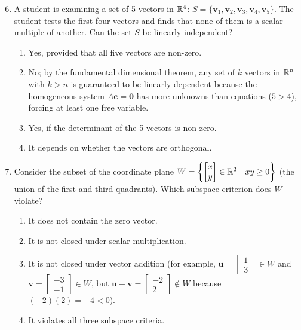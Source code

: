 \begin{enumerate}
    \setcounter{enumi}{5}
    \item A student is examining a set of 5 vectors in $\mathbb{R}^4$: $S = \{\mathbf{v}_1, \mathbf{v}_2, \mathbf{v}_3, \mathbf{v}_4, \mathbf{v}_5\}$. The student tests the first four vectors and finds that none of them is a scalar multiple of another. Can the set $S$ be linearly independent?
    \begin{enumerate}
        \item Yes, provided that all five vectors are non-zero.
        \item No; by the fundamental dimensional theorem, any set of $k$ vectors in $\mathbb{R}^n$ with $k > n$ is guaranteed to be linearly dependent because the homogeneous system $A\mathbf{c} = \mathbf{0}$ has more unknowns than equations ($5 > 4$), forcing at least one free variable.
        \item Yes, if the determinant of the 5 vectors is non-zero.
        \item It depends on whether the vectors are orthogonal.
    \end{enumerate}

    \item Consider the subset of the coordinate plane $W = \left\{ \begin{bmatrix} x \\ y \end{bmatrix} \in \mathbb{R}^2 \ \middle|\ xy \ge 0 \right\}$ (the union of the first and third quadrants). Which subspace criterion does $W$ violate?
    \begin{enumerate}
        \item It does not contain the zero vector.
        \item It is not closed under scalar multiplication.
        \item It is not closed under vector addition (for example, $\mathbf{u} = \begin{bmatrix} 1 \\ 3 \end{bmatrix} \in W$ and $\mathbf{v} = \begin{bmatrix} -3 \\ -1 \end{bmatrix} \in W$, but $\mathbf{u} + \mathbf{v} = \begin{bmatrix} -2 \\ 2 \end{bmatrix} \notin W$ because $(-2)(2) = -4 < 0$).
        \item It violates all three subspace criteria.
    \end{enumerate}
\end{enumerate}

